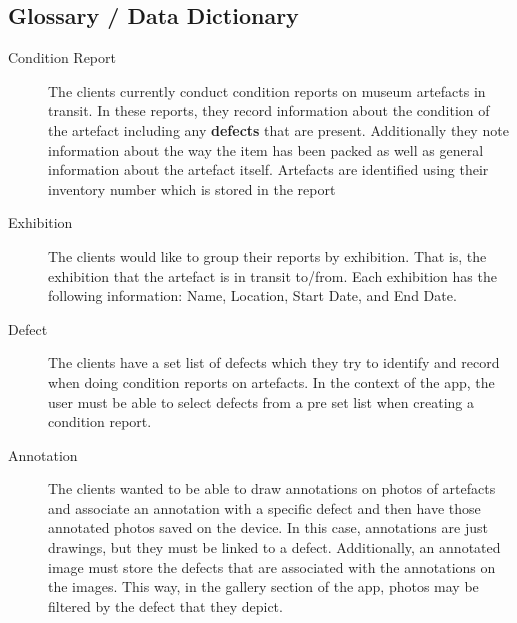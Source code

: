 \documentclass[12pt]{article}
\begin{document}
\subsection{Glossary / Data Dictionary}
\begin{description}
\item [Condition Report] The clients currently conduct condition reports on museum artefacts in transit. In these reports, they record information about the condition of the artefact including any \textbf{defects} that are present. Additionally they note information about the way the item has been packed as well as general information about the artefact itself. Artefacts are identified using their inventory number which is stored in the report

\item [Exhibition] The clients would like to group their reports by exhibition. That is, the exhibition that the artefact is in transit to/from. Each exhibition has the following information: Name, Location, Start Date, and End Date.

\item [Defect] The clients have a set list of defects which they try to identify and record when doing condition reports on artefacts. In the context of the app, the user must be able to select defects from a pre set list when creating a condition report.

\item [Annotation] The clients wanted to be able to draw annotations on photos of artefacts and associate an annotation with a specific defect and then have those annotated photos saved on the device. In this case, annotations are just drawings, but they must be linked to a defect. Additionally, an annotated image must store the defects that are associated with the annotations on the images. This way, in the gallery section of the app, photos may be filtered by the defect that they depict. 
\end{description}
\end{document}
